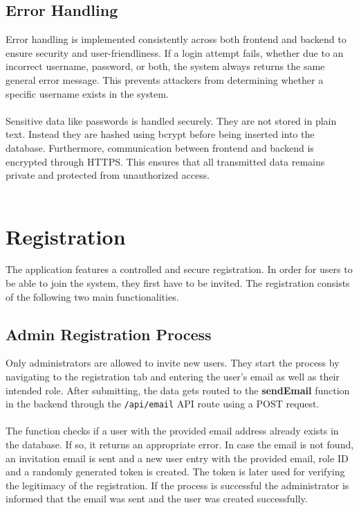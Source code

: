 \documentclass[a4paper,12pt]{report}
\begin{document}
\subsection{Error Handling}
Error handling is implemented consistently across both frontend and backend to ensure security and user-friendliness. If a login attempt fails, whether due to an incorrect username, password, or both, the system always returns the same general error message. This prevents attackers from determining whether a specific username exists in the system.\\\\
Sensitive data like passwords is handled securely. They are not stored in plain text. Instead they are hashed using bcrypt before being inserted into the database. Furthermore, communication between frontend and backend is encrypted through HTTPS. This ensures that all transmitted data remains private and protected from unauthorized access. \\ \\

\section{Registration}
The application features a controlled and secure registration. In order for users to be able to join the system, they first have to be invited. The registration consists of the following two main functionalities. \\
\subsection{Admin Registration Process}
Only administrators are allowed to invite new users. They start the process by navigating to the registration tab and entering the user's email as well as their intended role. After submitting, the data gets routed to the \textbf{sendEmail} function in the backend through the \texttt{/api/email} API route using a POST request. \\\\
The function checks if a user with the provided email address already exists in the database. If so, it returns an appropriate error. In case the email is not found, an invitation email is sent and a new user entry with the provided email, role ID and a randomly generated token is created. The token is later used for verifying the legitimacy of the registration. If the process is successful the administrator is informed that the email was sent and the user was created successfully. \\
\end{document}
